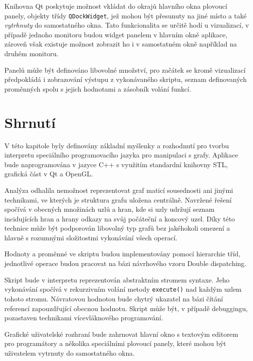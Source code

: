 \documentclass[11pt,twoside,a4paper]{book}
\begin{document}
Knihovna Qt poskytuje možnost vkládat do okrajů hlavního okna plovoucí panely, objekty třídy \texttt{QDockWidget}, jež mohou být přesunuty na jiné místo a také \textit{vytrhnuty} do samostatného okna. Tato funkcionalita se určitě hodí u vizualizací, v případě jednoho monitoru budou widget panelem v hlavním okně aplikace, zároveň však existuje možnost zobrazit ho i v samostatném okně například na druhém monitoru.

Panelů může být definováno libovolné množství, pro začátek se kromě vizualizací před\-po\-klá\-dá i zobrazování výstupu z vykonávaného skriptu, seznam definovaných proměnných spolu s jejich hodnotami a zásobník volání funkcí.


\section{Shrnutí}

V této kapitole byly definovány základní myšlenky a rozhodnutí pro tvorbu interpretu spe\-ci\-ál\-ní\-ho programovacího jazyka pro manipulaci s grafy. Aplikace bude naprogramována v jazyce C++ s využitím standardní knihovny STL, grafická část v Qt a OpenGL.

Analýza odhalila nemožnost reprezentovat graf maticí sousednosti ani jinými technikami, ve kterých je struktura grafu uložena centrálně. Navržené řešení spočívá v obecných množinách uzlů a hran, kde si uzly udržují seznam incidujících hran a hrany odkazy na svůj počáteční a koncový uzel. Díky této technice může být podporován libovolný typ grafů bez jakéhokoli omezení a hlavně s rozumnými složitostmi vykonávání všech operací.

Hodnoty a proměnné ve skriptu budou implementovány pomocí hierarchie tříd, jednotlivé operace budou pracovat na bázi návrhového vzoru Double dispatching.

Skript bude v interpretu reprezentován abstraktním stromem syntaxe. Jeho vykonávání spočívá v rekurzivním volání metody \texttt{execute()} nad každým uzlem tohoto stromu. Ná\-vra\-to\-vou hodnotou bude chytrý ukazatel na bázi čítání referencí zapouzdřující obecnou hodnotu. Skript může být, v případě debuggingu, pozastaven technikami ví\-ce\-vlák\-no\-vé\-ho programování.

Grafické uživatelské rozhraní bude zahrnovat hlavní okno s textovým editorem pro programátory a několika speciálními plovoucí panely, které mohou být uživatelem vytrnuty do samostatného okna.


\end{document}
